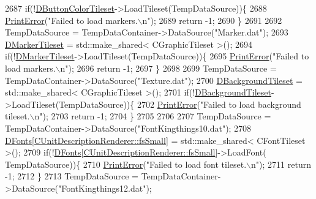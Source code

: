 \begin{DoxyCode}
2687     \textcolor{keywordflow}{if}(!\hyperlink{classCApplicationData_a7482e0b4d7e0ce4979eb9f28872023ad}{DButtonColorTileset}->LoadTileset(TempDataSource))\{
2688         \hyperlink{Debug_8h_a2ed825eefefe35baf59a93a8c641323d}{PrintError}(\textcolor{stringliteral}{"Failed to load markers.\(\backslash\)n"});
2689         \textcolor{keywordflow}{return} -1;
2690     \}
2691     
2692     TempDataSource = TempDataContainer->DataSource(\textcolor{stringliteral}{"Marker.dat"});
2693     \hyperlink{classCApplicationData_ae9f336696b810bff2353d731300ec9d7}{DMarkerTileset} = std::make\_shared< CGraphicTileset >();
2694     \textcolor{keywordflow}{if}(!\hyperlink{classCApplicationData_ae9f336696b810bff2353d731300ec9d7}{DMarkerTileset}->LoadTileset(TempDataSource))\{
2695         \hyperlink{Debug_8h_a2ed825eefefe35baf59a93a8c641323d}{PrintError}(\textcolor{stringliteral}{"Failed to load markers.\(\backslash\)n"});
2696         \textcolor{keywordflow}{return} -1;
2697     \}
2698     
2699     TempDataSource = TempDataContainer->DataSource(\textcolor{stringliteral}{"Texture.dat"});
2700     \hyperlink{classCApplicationData_a93e478c5552a527fe2d680cac8fc910d}{DBackgroundTileset} = std::make\_shared< CGraphicTileset >();
2701     \textcolor{keywordflow}{if}(!\hyperlink{classCApplicationData_a93e478c5552a527fe2d680cac8fc910d}{DBackgroundTileset}->LoadTileset(TempDataSource))\{
2702         \hyperlink{Debug_8h_a2ed825eefefe35baf59a93a8c641323d}{PrintError}(\textcolor{stringliteral}{"Failed to load background tileset.\(\backslash\)n"});
2703         \textcolor{keywordflow}{return} -1;
2704     \}    
2705     
2706     
2707     TempDataSource = TempDataContainer->DataSource(\textcolor{stringliteral}{"FontKingthings10.dat"});
2708     \hyperlink{classCApplicationData_afde9247d0a3ea87393ec86dcdb1e8274}{DFonts}[\hyperlink{classCUnitDescriptionRenderer_a3ea4cd83b6dd9533ab3abb953a7da35aaa0ab2dd25d9db891e7a7158795b46c63}{CUnitDescriptionRenderer::fsSmall}] = std::make\_shared<
       CFontTileset >();
2709     \textcolor{keywordflow}{if}(!\hyperlink{classCApplicationData_afde9247d0a3ea87393ec86dcdb1e8274}{DFonts}[\hyperlink{classCUnitDescriptionRenderer_a3ea4cd83b6dd9533ab3abb953a7da35aaa0ab2dd25d9db891e7a7158795b46c63}{CUnitDescriptionRenderer::fsSmall}]->LoadFont(
      TempDataSource))\{
2710         \hyperlink{Debug_8h_a2ed825eefefe35baf59a93a8c641323d}{PrintError}(\textcolor{stringliteral}{"Failed to load font tileset.\(\backslash\)n"});
2711         \textcolor{keywordflow}{return} -1;
2712     \}
2713     TempDataSource = TempDataContainer->DataSource(\textcolor{stringliteral}{"FontKingthings12.dat"});

\end{DoxyCode}
